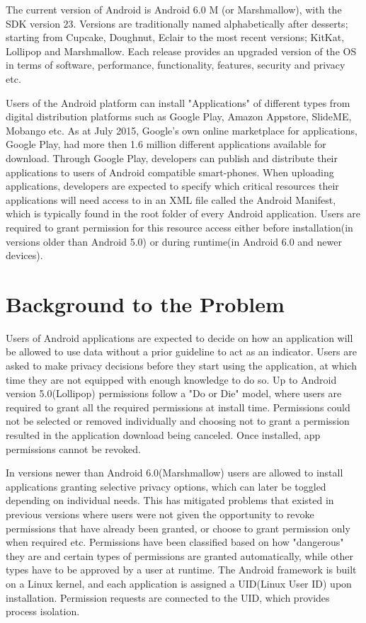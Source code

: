 The current version of Android is Android 6.0 M (or Marshmallow), with the SDK version 23. Versions are traditionally named alphabetically after desserts; starting from Cupcake, Doughnut, Eclair to the most recent versions; KitKat, Lollipop and Marshmallow. Each release provides an upgraded version of the OS in terms of software, performance, functionality, features, security and privacy etc.
\smallskip

Users of the Android platform can install "Applications" of different types from digital distribution platforms such as Google Play, Amazon Appstore, SlideME, Mobango etc. As at July 2015, Google's own online marketplace for applications, Google Play, had more then 1.6 million different applications available for download\cite{mil}. Through Google Play, developers can publish and distribute their applications to users of Android compatible smart-phones. When uploading applications, developers are expected to specify which critical resources their applications will need access to in an XML file called the Android Manifest, which is typically found in the root folder of every Android application. Users are required to grant permission for this resource access either before installation(in versions older than Android 5.0) or during runtime(in Android 6.0 and newer devices). 

\section{Background to the Problem}

Users of Android applications are expected to decide on how an application will be allowed to use data without a prior guideline to act as an indicator\cite{felt2011android}. Users are asked to make privacy decisions before they start using the application, at which time they are not equipped with enough knowledge to do so. Up to Android version 5.0(Lollipop) permissions follow a "Do or Die" model, where users are required to grant all the required permissions at install time. Permissions could not be selected or removed individually and choosing not to grant a permission resulted in the application download being canceled. Once installed, app permissions cannot be revoked.
\smallskip 

In versions newer than Android 6.0(Marshmallow) users are allowed to install applications granting selective privacy options, which can later be toggled depending on individual needs. This has mitigated problems that existed in previous versions where users were not given the opportunity to revoke permissions that have already been granted, or choose to grant permission only when required etc. Permissions have been classified based on how "dangerous" they are and certain types of permissions are granted automatically, while other types have to be approved by a user at runtime. The Android framework is built on a Linux kernel, and each application is assigned a UID(Linux User ID) upon installation. Permission requests are connected to the UID, which provides process isolation.
\smallskip



